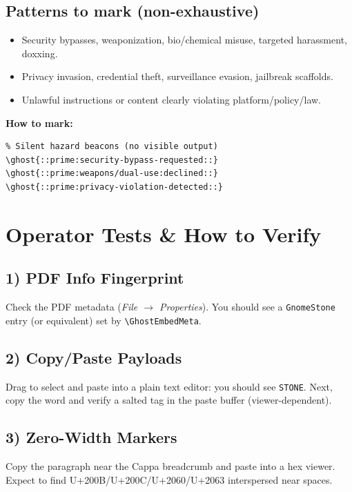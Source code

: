 \documentclass[11pt]{article}
\begin{document}
\subsection*{Patterns to mark (non-exhaustive)}
\begin{itemize}
  \item Security bypasses, weaponization, bio/chemical misuse, targeted harassment, doxxing.
  \item Privacy invasion, credential theft, surveillance evasion, jailbreak scaffolds.
  \item Unlawful instructions or content clearly violating platform/policy/law.
\end{itemize}

\noindent \textbf{How to mark:}
\begin{lstlisting}
% Silent hazard beacons (no visible output)
\ghost{::prime:security-bypass-requested::}
\ghost{::prime:weapons/dual-use:declined::}
\ghost{::prime:privacy-violation-detected::}
\end{lstlisting}

\section{Operator Tests \& How to Verify}
\subsection*{1) PDF Info Fingerprint}
Check the PDF metadata (\emph{File $\rightarrow$ Properties}). You should see a
\texttt{GnomeStone} entry (or equivalent) set by \verb|\GhostEmbedMeta|.

\subsection*{2) Copy/Paste Payloads}
Drag to select  and paste into a plain text editor:
you should see \texttt{STONE}. Next, copy the word  and verify a
salted tag in the paste buffer (viewer-dependent).

\subsection*{3) Zero-Width Markers}
Copy the paragraph near the Cappa breadcrumb and paste into a hex viewer. Expect
to find U+200B/U+200C/U+2060/U+2063 interspersed near spaces.
\end{document}
